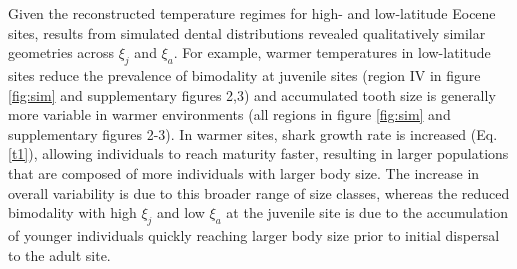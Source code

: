\documentclass[]{rsos}%
\begin{document}
Given the reconstructed temperature regimes for high- and low-latitude Eocene sites, results from simulated dental distributions revealed qualitatively similar geometries across $\xi_j$ and $\xi_a$. 
For example, warmer temperatures in low-latitude sites reduce the prevalence of bimodality at juvenile sites (region IV in figure \ref{fig:sim} and supplementary figures 2,3) and accumulated tooth size is generally more variable in warmer environments (all regions in figure \ref{fig:sim} and supplementary figures 2-3).
In warmer sites, shark growth rate is increased (Eq. \ref{t1}), allowing individuals to reach maturity faster, resulting in larger populations that are composed of more individuals with larger body size.
The increase in overall variability is due to this broader range of size classes, whereas the reduced bimodality with high $\xi_j$ and low $\xi_a$ at the juvenile site is due to the accumulation of younger individuals quickly reaching larger body size prior to initial dispersal to the adult site.
\end{document}
